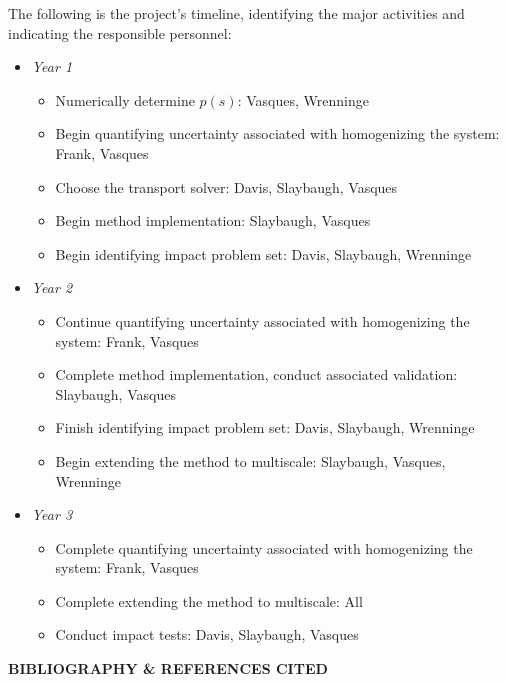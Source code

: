 \documentclass[12pt]{article}
\begin{document}
The following is the project's timeline, identifying the major activities and indicating the responsible personnel:
\begin{itemize}
\item \textit{Year 1}
\begin{itemize}[noitemsep]
\item Numerically determine $p(s)$: Vasques, Wrenninge
\item Begin quantifying uncertainty associated with homogenizing the system: Frank, Vasques
\item Choose the transport solver: Davis, Slaybaugh, Vasques
\item Begin method implementation: Slaybaugh, Vasques
\item Begin identifying impact problem set: Davis, Slaybaugh, Wrenninge
\end{itemize}
\item \textit{Year 2}
\begin{itemize}[noitemsep]
\item Continue quantifying uncertainty associated with homogenizing the system: Frank, Vasques
\item Complete method implementation, conduct associated validation: Slaybaugh, Vasques
\item Finish identifying impact problem set: Davis, Slaybaugh, Wrenninge
\item Begin extending the method to multiscale: Slaybaugh, Vasques, Wrenninge
\end{itemize}
\item \textit{Year 3}
\begin{itemize}[noitemsep]
\item Complete quantifying uncertainty associated with homogenizing the system: Frank, Vasques
\item Complete extending the method to multiscale: All
\item Conduct impact tests: Davis, Slaybaugh, Vasques
\end{itemize}
\end{itemize}



\pagebreak


\begin{center}
{\bf BIBLIOGRAPHY \& REFERENCES CITED}
\end{center}
\end{document}
